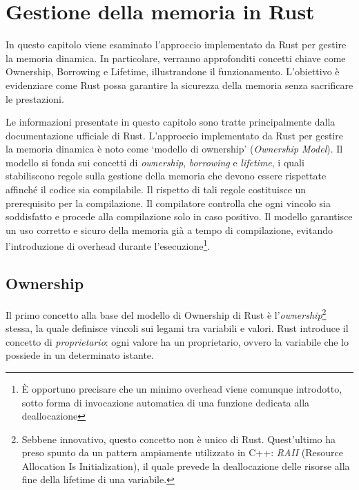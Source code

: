 
\chapter{Gestione della memoria in Rust}\label{cap:03}

In questo capitolo viene esaminato l'approccio implementato da Rust per gestire la memoria dinamica. In particolare, verranno approfonditi concetti chiave come Ownership, Borrowing e Lifetime, illustrandone il funzionamento. L'obiettivo è evidenziare come Rust possa garantire la sicurezza della memoria senza sacrificare le prestazioni.

Le informazioni presentate in questo capitolo sono tratte principalmente dalla documentazione ufficiale di Rust\cite{rust-book}. \hfill
\vspace{15pt}
\noindent L'approccio implementato da Rust per gestire la memoria dinamica è noto come `modello di ownership' (\textit{Ownership Model}). Il modello si fonda sui concetti di \textit{ownership}, \textit{borrowing} e \textit{lifetime}, i quali stabiliscono regole sulla gestione della memoria che devono essere rispettate affinché il codice sia compilabile. Il rispetto di tali regole costituisce un prerequisito per la compilazione. Il compilatore controlla che ogni vincolo sia soddisfatto e procede alla compilazione solo in caso positivo. Il modello garantisce un uso corretto e sicuro della memoria già a tempo di compilazione, evitando l'introduzione di overhead durante l'esecuzione\footnote{È opportuno precisare che un minimo overhead viene comunque introdotto, sotto forma di invocazione  automatica di una funzione dedicata alla deallocazione}.
\section{Ownership}
Il primo concetto alla base del modello di Ownership di Rust è l'\textit{ownership}\footnote{Sebbene innovativo, questo concetto non è unico di Rust. Quest'ultimo ha preso spunto da un pattern ampiamente utilizzato in C++: \textit{RAII} (Resource Allocation Is Initialization), il quale prevede la deallocazione delle risorse alla fine della lifetime di una variabile.} stessa, la quale definisce vincoli sui legami tra variabili e valori. Rust introduce il concetto di \textit{proprietario}: ogni valore ha un proprietario, ovvero la variabile che lo possiede in un determinato istante.

